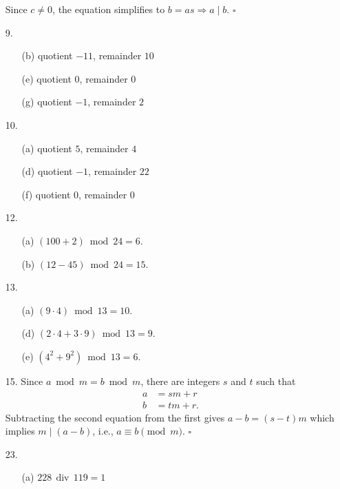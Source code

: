 \documentclass{article}
\begin{document}
\begin{enumerate}
    Since $c \neq 0$, the equation simplifies to $b = as \Rightarrow a \mid b$. $\square$
    \item[9.]
        \begin{itemize}
            \item[(b)] quotient $-11$, remainder $10$
            \item[(e)] quotient $0$, remainder $0$
            \item[(g)] quotient $-1$, remainder $2$
        \end{itemize}
    \item[10.]
        \begin{itemize}
            \item[(a)] quotient $5$, remainder $4$
            \item[(d)] quotient $-1$, remainder $22$
            \item[(f)] quotient $0$, remainder $0$
        \end{itemize}
    \item[12.]
        \begin{itemize}
            \item[(a)]  $(100 + 2) \bmod 24 = 6$.
            \item[(b)]  $(12 - 45) \bmod 24 = 15$.
        \end{itemize}
    \item[13.]
        \begin{itemize}
            \item[(a)]  $(9 \cdot 4) \bmod 13 = 10$.
            \item[(d)]  $(2 \cdot 4 + 3 \cdot 9) \bmod 13 = 9$.
            \item[(e)]  $(4^2 + 9^2) \bmod 13 = 6$.
        \end{itemize}
    \item[15.] Since $a \bmod m = b \bmod m$, there are integers $s$ and $t$ such that
        \begin{align*}
        a &= sm+r \\
        b &= tm+r.
        \end{align*}
        Subtracting the second equation from the first gives $a-b = (s-t)m$ which implies $m \mid (a-b)$, i.e., $a \equiv b \pmod m$. $\square$
    \item[23.]
        \begin{itemize}
            \item[(a)] $228 \,\operatorname{div}\, 119 = 1$


\end{itemize}
\end{enumerate}
\end{document}
